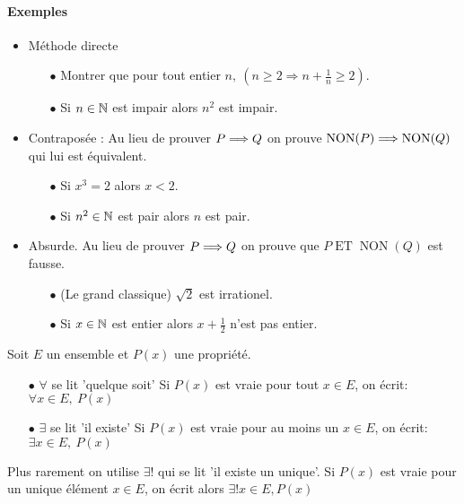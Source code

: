 \documentclass[a4paper, 11pt]{article}
\DeclareMathOperator{\NON}{NON}
\DeclareMathOperator{\ET}{ET}
\begin{document}
\paragraph{Exemples}
\begin{itemize}
    \item Méthode directe
    \begin{itemize}
        \item[$\bullet$] Montrer que pour tout entier $n,\ \left( n\geq 2\Rightarrow n+\frac{1}{n}\geq 2  \right)$.
        \item[$\bullet$] Si $n\in \mathbb{N}$ est impair  alors $n^2$ est impair. 
        \end{itemize}
    \item Contraposée : Au lieu de prouver $P\Longrightarrow Q$ on prouve $\NON(P) \implique \NON(Q)$ qui lui est équivalent. 
    \begin{itemize}
        \item[$\bullet$] Si $x^3=2$ alors $x<2$.
        \item[$\bullet$] Si $n^2\in \mathbb{N}$ est pair  alors $n$ est pair. 
    \end{itemize}
    \item Absurde. Au lieu de prouver $P\Longrightarrow Q$ on prouve que $P \ET \NON(Q)$ est fausse. 

   \begin{itemize}
        \item[$\bullet$] (Le grand classique) $\sqrt{2}$ est irrationel. 
         \item[$\bullet$] Si $x\in \mathbb{N}$ est entier  alors $\displaystyle x+\frac{1}{2}$ n'est pas entier. 
    \end{itemize}
\end{itemize}


\newpage
\begin{defi} Soit $E$ un ensemble et $P(x)$ une propri\'et\'e.
\begin{itemize}
\item[$\bullet$] $\mathbf{\forall}$ se lit 'quelque soit'
Si $P(x)$ est vraie pour tout $x\in E$, on \'ecrit: $\forall x\in E,\ P(x)$
\item[$\bullet$] $\mathbf{\exists}$ se lit 'il existe'
Si $P(x)$ est vraie pour au moins un $x\in E$, on \'ecrit: $\exists x\in E,\ P(x)$
\end{itemize}
\end{defi}

Plus rarement on utilise $\exists!$ qui se lit 'il existe un unique'. Si $P(x)$ est vraie pour un unique \'el\'ement $x\in E$, on écrit alors $\exists ! x \in E, P(x)$
\end{document}
